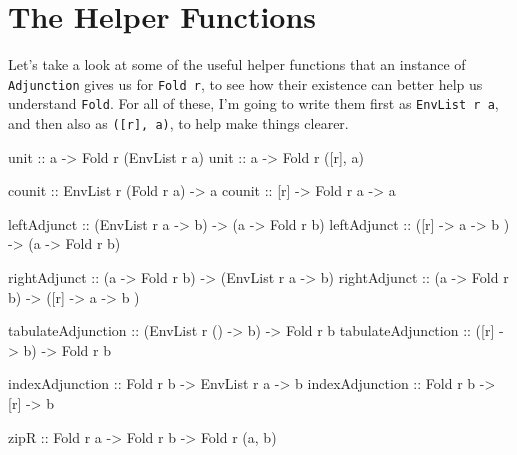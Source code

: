 \documentclass[]{article}
\newenvironment{Shaded}{}{}
\newcommand{\DataTypeTok}[1]{\textcolor[rgb]{0.56,0.13,0.00}{#1}}
\newcommand{\NormalTok}[1]{#1}
\newcommand{\OtherTok}[1]{\textcolor[rgb]{0.00,0.44,0.13}{#1}}
\begin{document}
\hypertarget{the-helper-functions}{%
\section{The Helper Functions}\label{the-helper-functions}}

Let's take a look at some of the useful helper functions that an instance of
\texttt{Adjunction} gives us for \texttt{Fold\ r}, to see how their existence
can better help us understand \texttt{Fold}. For all of these, I'm going to
write them first as \texttt{EnvList\ r\ a}, and then also as
\texttt{({[}r{]},\ a)}, to help make things clearer.

\begin{Shaded}
\begin{Highlighting}[]
\OtherTok{unit ::}\NormalTok{ a }\OtherTok{{-}>} \DataTypeTok{Fold}\NormalTok{ r (}\DataTypeTok{EnvList}\NormalTok{ r a)}
\OtherTok{unit ::}\NormalTok{ a }\OtherTok{{-}>} \DataTypeTok{Fold}\NormalTok{ r ([r], a)}

\OtherTok{counit ::} \DataTypeTok{EnvList}\NormalTok{ r (}\DataTypeTok{Fold}\NormalTok{ r a) }\OtherTok{{-}>}\NormalTok{ a}
\OtherTok{counit ::}\NormalTok{ [r] }\OtherTok{{-}>} \DataTypeTok{Fold}\NormalTok{ r a }\OtherTok{{-}>}\NormalTok{ a}

\OtherTok{leftAdjunct ::}\NormalTok{ (}\DataTypeTok{EnvList}\NormalTok{ r a }\OtherTok{{-}>}\NormalTok{ b) }\OtherTok{{-}>}\NormalTok{ (a }\OtherTok{{-}>} \DataTypeTok{Fold}\NormalTok{ r b)}
\OtherTok{leftAdjunct ::}\NormalTok{ ([r] }\OtherTok{{-}>}\NormalTok{ a }\OtherTok{{-}>}\NormalTok{ b   ) }\OtherTok{{-}>}\NormalTok{ (a }\OtherTok{{-}>} \DataTypeTok{Fold}\NormalTok{ r b)}

\OtherTok{rightAdjunct ::}\NormalTok{ (a }\OtherTok{{-}>} \DataTypeTok{Fold}\NormalTok{ r b) }\OtherTok{{-}>}\NormalTok{ (}\DataTypeTok{EnvList}\NormalTok{ r a }\OtherTok{{-}>}\NormalTok{ b)}
\OtherTok{rightAdjunct ::}\NormalTok{ (a }\OtherTok{{-}>} \DataTypeTok{Fold}\NormalTok{ r b) }\OtherTok{{-}>}\NormalTok{ ([r] }\OtherTok{{-}>}\NormalTok{ a }\OtherTok{{-}>}\NormalTok{ b   )}

\OtherTok{tabulateAdjunction ::}\NormalTok{ (}\DataTypeTok{EnvList}\NormalTok{ r () }\OtherTok{{-}>}\NormalTok{ b) }\OtherTok{{-}>} \DataTypeTok{Fold}\NormalTok{ r b}
\OtherTok{tabulateAdjunction ::}\NormalTok{ ([r] }\OtherTok{{-}>}\NormalTok{ b)          }\OtherTok{{-}>} \DataTypeTok{Fold}\NormalTok{ r b}

\OtherTok{indexAdjunction ::} \DataTypeTok{Fold}\NormalTok{ r b }\OtherTok{{-}>} \DataTypeTok{EnvList}\NormalTok{ r a }\OtherTok{{-}>}\NormalTok{ b}
\OtherTok{indexAdjunction ::} \DataTypeTok{Fold}\NormalTok{ r b }\OtherTok{{-}>}\NormalTok{ [r]         }\OtherTok{{-}>}\NormalTok{ b}

\OtherTok{zipR ::} \DataTypeTok{Fold}\NormalTok{ r a }\OtherTok{{-}>} \DataTypeTok{Fold}\NormalTok{ r b }\OtherTok{{-}>} \DataTypeTok{Fold}\NormalTok{ r (a, b)}
\end{Highlighting}
\end{Shaded}
\end{document}
